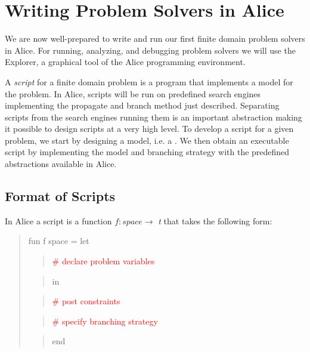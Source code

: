 \documentclass[a4paper,halfparskip]{scrartcl}
\begin{document}
\newpage
\section{Writing Problem Solvers in Alice}

We are now well-prepared to write and run our first finite 
domain problem solvers in Alice. 
For running, analyzing, and debugging problem solvers we 
will use the Explorer, a graphical 
tool of the Alice programming environment.

A \emph{script} for a finite domain problem is a program 
that implements a model for the problem. 
In Alice, scripts will be run on predefined 
search engines implementing the propagate 
and branch method just described. Separating scripts 
from the search engines running them 
is an important abstraction making it possible to design 
scripts at a very high level. To 
develop a script for a given problem, we start by designing 
a model, i.e. a . 
We then obtain an executable script by implementing the model 
and branching strategy with the 
predefined abstractions available in Alice. 


\subsection{Format of Scripts}
In Alice a script is a function $ f : space \rightarrow $ \emph{t} 
that takes the following form:
\begin{quote}
fun f space = let
\begin{quote}
\hspace{15mm}\textcolor{red}{\# declare problem variables}
\end{quote} 
\begin{quote}
\hspace{15mm} in
\end{quote} 
\begin{quote}
\hspace{15mm}\textcolor{red}{\# post constraints}
\end{quote} 
\begin{quote}
\hspace{15mm}\textcolor{red}{\# specify branching strategy}
\end{quote} 
\begin{quote}
\hspace{15mm}end
\end{quote}             
\end{quote}
\end{document}
